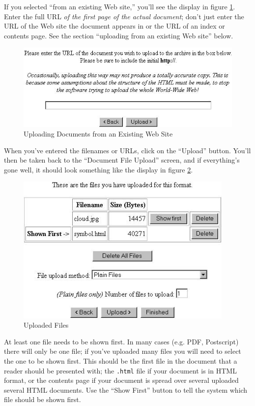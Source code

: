 If you selected ``from an existing Web site,'' you'll see the display in figure \ref{upload_web}. Enter the full URL \emph{of the first page of the actual document}; don't just enter the URL of the Web site the document appears in or the URL of an index or contents page. See the section ``uploading from an existing Web site'' below.

\begin{figure}
\centerline{\includegraphics[width=4.8in]{images/upload-web}}
\caption{\label{upload_web} Uploading Documents from an Existing Web Site}
\end{figure}

When you've entered the filenames or URLs, click on the ``Upload'' button. You'll then be taken back to the ``Document File Upload'' screen, and if everything's gone well, it should look something like the display in figure \ref{uploaded_files}.

\begin{figure}
\centerline{\includegraphics[width=4.2in]{images/uploaded-files}}
\caption{\label{uploaded_files} Uploaded Files}
\end{figure}

At least one file needs to be shown first. In many cases (e.g. PDF, Postscript) there will only be one file; if you've uploaded many files you will need to select the one to be shown first. This should be the first file in the document that a reader should be presented with; the {\tt .html} file if your document is in HTML format, or the contents page if your document is spread over several uploaded several HTML documents. Use the ``Show First'' button to tell the system which file should be shown first.

